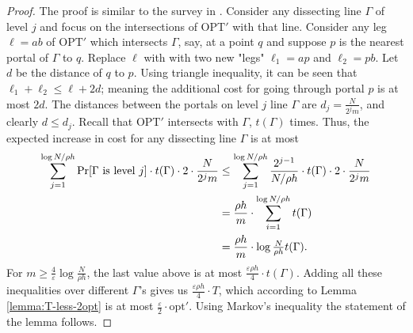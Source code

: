 \documentclass[pdflatex,sn-mathphys-num]{sn-jnl}
\theoremstyle{thmstyleone}
\newcommand{\eps}{\varepsilon}
\newcommand{\opt}{{\text{opt}}}
\newcommand{\OPT}{{\text{OPT}}}
\begin{document}
\begin{proof}
	The proof is similar to the survey in \cite{Vazirani}.
    Consider any dissecting line $\Gamma$ of level $j$ and focus on the intersections of $\OPT'$ with that line. Consider any leg $\ell = ab$ of $\OPT'$ which intersects $\Gamma$, say, at a point $q$ and suppose $p$ is the nearest portal of $\Gamma$ to $q$. Replace $\ell$ with
    with two new "legs" $\ell_1 = ap$ and $\ell_2 = pb$. Let $d$ be the distance of $q$ to $p$. Using triangle inequality, it can be seen that $\ell_1 + \ell_2 \leq \ell + 2d$; meaning the additional cost for going through portal $p$ is at most $2d$. The distances between the portals on level $j$ line $\Gamma$ are $d_j = \frac N{2^jm}$, and clearly $d\le d_j$. Recall that $\OPT'$ intersects with $\Gamma$, $t(\Gamma)$ times. Thus, the expected increase in cost for any dissecting line $\Gamma$ is at most
    \begin{align*}
        \sum_{j = 1}^{\log N/\rho h}\Pr[\Gamma {\rm \ is\ level\ } j]\cdot t(\Gamma)\cdot 2\cdot\frac N{2^jm} &\le \sum_{j = 1}^{\log N/\rho h}\frac{2^{j - 1}}{N/\rho h}\cdot t(\Gamma)\cdot2\cdot \frac N{2^j m}\\
        &= \frac{\rho h}m\cdot \sum_{i = 1}^{\log N/\rho h} t(\Gamma)\\
        &= \frac{\rho h}m \cdot \log \tfrac N{\rho h} t(\Gamma).
    \end{align*}
    For
    $m \ge \frac{4}\eps \log\frac N{\rho h}$, the last value above is at most $ \frac{\eps\rho h}{4}\cdot t(\Gamma)$. Adding all these inequalities over different $\Gamma$'s gives us $\frac{\eps\rho h}{4}\cdot T$, which according to Lemma \ref{lemma:T-less-2opt} is at most $\frac\eps2\cdot \opt'$. Using Markov's inequality the statement of the lemma follows.
\end{proof}
\end{document}
